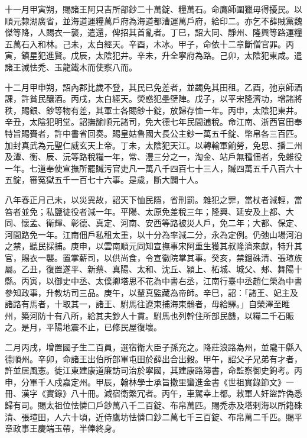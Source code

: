 \begin{pinyinscope}
 十一月甲寅朔，賜諸王阿只吉所部鈔二十萬錠、糧萬石。命鷹師圍獵毋得擾民。以順元隸湖廣省，並海道運糧萬戶府為海道都漕運萬戶府，給印二。亦乞不薛賊黨魏傑等降，人賜衣一襲，遣還，俾招其首亂者。丁巳，詔大同、靜州、隆興等路運糧五萬石入和林。己未，太白經天。辛酉，木冰。甲子，命依十二章斷僧官罪。丙寅，鎮星犯進賢。戊辰，太陰犯井。辛未，升全寧府為路。己卯，太陰犯東咸。遣諸王滅怯禿、玉龍鐵木而使察八而。



 十二月甲申朔，詔內郡比歲不登，其民已免差者，並蠲免其田租。乙酉，弛京師酒課，許貧民釀酒。丙戌，太白經天。熒惑犯壘壁陣。戊子，以平宋隆濟功，增諸將秩，賜銀、鈔等物有差，其軍士各賜鈔十錠，放歸存恤一年。丙申，太陰犯東井。辛丑，太陰犯明堂。詔撫諭順元諸司，免大德七年民間逋稅。命江南、浙西官田奉特旨賜賚者，許中書省回奏。賜皇姑魯國大長公主鈔一萬五千錠、幣帛各三百匹。加封真武為元聖仁威玄天上帝。丁未，太陰犯天江。以轉輸軍餉勞，免思、播二州及潭、衡、辰、沅等路稅糧一年，常、澧三分之一，淘金、站戶無種佃者，免雜役一年。七道奉使宣撫所罷贓污官吏凡一萬八千四百七十三人，贓四萬五千八百六十五錠，審冤獄五千一百七十六事。是歲，斷大闢十人。



 八年春正月己未，以災異故，詔天下恤民隱，省刑罰。雜犯之罪，當杖者減輕，當笞者並免；私鹽徒役者減一年。平陽、太原免差稅三年；隆興、延安及上都、大同、懷孟、衛輝、彰德、真定、河南、安西等路被災人戶，免二年；大都、保定、河間路免一年。江南佃戶私租太重，以十分為率減二分，永為定例。仍弛山場河泊之禁，聽民採捕。庚申，以雲南順元同知宣撫事宋阿重生獲其叔隆濟來獻，特升其官，賜衣一襲。置掌薪司，以供尚食，令宣徽院掌其事。癸亥，禁錮硃清、張瑄族屬。乙丑，復置遂平、新蔡、真陽、太和、沈丘、潁上、柘城、城父、郟、舞陽十縣。丙寅，以御史中丞、太僕卿塔思不花為中書右丞，江南行臺中丞趙仁榮為中書參知政事，升教坊司三品。庚午，以輦真監藏為帝師。辛巳，詔：「諸王、妃主及諸路有馬者，十取其一，諸王、駙馬往遼東捕海東鶻者，毋給驛。」自榮澤至睢州，築河防十有八所，給其夫鈔人十貫。駙馬也列幹住所部民饑，以糧二千石賑之。是月，平陽地震不止，已修民屋復壞。



 二月丙戌，增置國子生二百員，選宿衛大臣子孫充之。降莊浪路為州，並隴干縣入德順州。辛卯，命諸王出伯所部軍屯田於薛出合出穀。甲午，詔父子兄弟有才者，許並居風憲。徙江東建康道廉訪司治於寧國，其建康路簿書，命監察御史鉤考。丙申，分軍千人戍嘉定州。甲辰，翰林學士承旨撒里蠻進金書《世祖實錄節文》一冊、漢字《實錄》八十冊。減宿衛繁冗者。丙午，車駕幸上都。敕軍人奸盜詐偽悉歸有司。賜太祖位怯憐口戶鈔萬八千二百錠、布帛萬匹。賜禿赤及塔剌海以所籍硃清、張瑄田，人六十頃，近侍鷹坊怯憐口鈔二萬七千三百錠、布帛萬二千匹。賜平章政事王慶端玉帶，半俸終身。




\end{pinyinscope}
